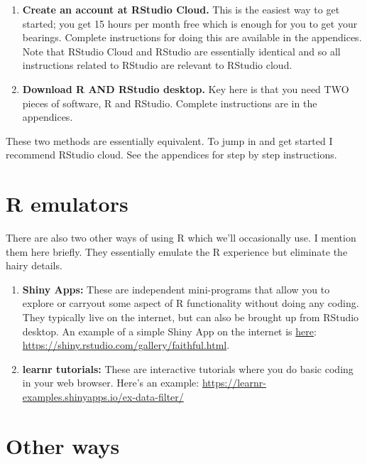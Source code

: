 \documentclass[
]{book}
\providecommand{\tightlist}{%
  \setlength{\itemsep}{0pt}\setlength{\parskip}{0pt}}
\begin{document}
\begin{enumerate}
\def\labelenumi{\arabic{enumi}.}
\tightlist
\item
  \textbf{Create an account at RStudio Cloud.} This is the easiest way to get started; you get 15 hours per month free which is enough for you to get your bearings. Complete instructions for doing this are available in the appendices. Note that RStudio Cloud and RStudio are essentially identical and so all instructions related to RStudio are relevant to RStudio cloud.\\
\item
  \textbf{Download R AND RStudio desktop.} Key here is that you need TWO pieces of software, R and RStudio. Complete instructions are in the appendices.
\end{enumerate}

These two methods are essentially equivalent. To jump in and get started I recommend RStudio cloud. See the appendices for step by step instructions.

\hypertarget{r-emulators}{%
\section{R emulators}\label{r-emulators}}

There are also two other ways of using R which we'll occasionally use. I mention them here briefly. They essentially emulate the R experience but eliminate the hairy details.

\begin{enumerate}
\def\labelenumi{\arabic{enumi}.}
\tightlist
\item
  \textbf{Shiny Apps:} These are independent mini-programs that allow you to explore or carryout some aspect of R functionality without doing any coding. They typically live on the internet, but can also be brought up from RStudio desktop. An example of a simple Shiny App on the internet is \href{https://shiny.rstudio.com/gallery/faithful.html}{here}: \url{https://shiny.rstudio.com/gallery/faithful.html}.
\item
  \textbf{learnr tutorials:} These are interactive tutorials where you do basic coding in your web browser. Here's an example: \url{https://learnr-examples.shinyapps.io/ex-data-filter/}
\end{enumerate}

\hypertarget{other-ways}{%
\section{Other ways}\label{other-ways}}
\end{document}
